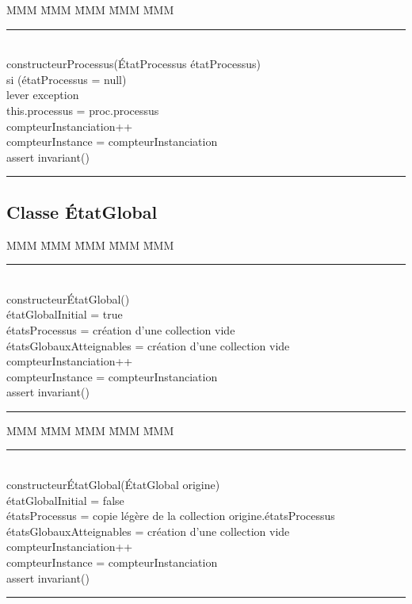\documentclass[11pt,article]{article}
\begin{document}
\begin{tabbing}
MMM \= MMM \= MMM \= MMM \= MMM \kill
\rule{12cm}{0.2mm} \\
\textsf{\large constructeurProcessus(ÉtatProcessus étatProcessus)} \\
\> si (étatProcessus = null)\\
\> \> lever exception\\
\> this.processus = proc.processus\\
\> compteurInstanciation++\\
\> compteurInstance = compteurInstanciation\\
\> assert invariant()\\
\rule{12cm}{0.2mm}
\end{tabbing}

\newpage

\subsection{Classe \textsf{ÉtatGlobal}}

\begin{tabbing}
MMM \= MMM \= MMM \= MMM \= MMM \kill
\rule{12cm}{0.2mm} \\
\textsf{\large constructeurÉtatGlobal()} \\
\> étatGlobalInitial = true\\
\> étatsProcessus = création d'une collection vide\\
\> étatsGlobauxAtteignables = création d'une collection vide\\
\> compteurInstanciation++\\
\> compteurInstance = compteurInstanciation\\
\> assert invariant()\\
\rule{12cm}{0.2mm}
\end{tabbing}

\begin{tabbing}
MMM \= MMM \= MMM \= MMM \= MMM \kill
\rule{12cm}{0.2mm} \\
\textsf{\large constructeurÉtatGlobal(ÉtatGlobal origine)} \\
\> étatGlobalInitial = false\\
\> étatsProcessus = copie légère de la collection origine.étatsProcessus\\
\> étatsGlobauxAtteignables = création d'une collection vide\\
\> compteurInstanciation++\\
\> compteurInstance = compteurInstanciation\\
\> assert invariant()\\
\rule{12cm}{0.2mm}
\end{tabbing}
\end{document}
